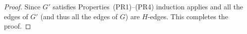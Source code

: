 \begin{proof}
	
	
	Since $G'$ satisfies Properties~(PR1)--(PR4) induction applies and all the edges of $G'$ (and thus all the edges of $G$) are $H$-edges. This completes the proof.
\end{proof}

